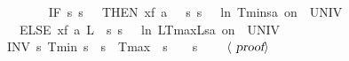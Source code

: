\documentclass[envcountsame]{llncs}
\begin{document}
\begin{example}
\begin{isabellebody}
\ \ \ \ %
\isanewline
\ \ \ \ {\isacharparenleft}IF\ {\isacharparenleft}{\isasymlambda}s{\isachardot}\ s{\isachardollar}{}\ {\isacharequal}\ {}{\isacharparenright}\ THEN\ {\isacharparenleft}x{\isasymacute}{\isacharequal}{\isacharparenleft}f\ a\ {}{\isacharparenright}\ {\isacharampersand}\ {\isacharparenleft}{\isasymlambda}s{\isachardot}\ s{\isachardollar}{}\ {\isasymle}\ {\isacharminus}\ {\isacharparenleft}ln\ {\isacharparenleft}Tmin{\isacharslash}s{\isachardollar}{}{\isacharparenright}{\isacharparenright}{\isacharslash}a{\isacharparenright}\ on\ {\isacharbraceleft}{}{\isachardot}{\isachardot}{\isasymtau}{\isacharbraceright}\ UNIV\ {\isacharat}\ {}{\isacharparenright}\ \isanewline
\ \ \ \ ELSE\ {\isacharparenleft}x{\isasymacute}{\isacharequal}{\isacharparenleft}f\ a\ L{\isacharparenright}\ {\isacharampersand}\ {\isacharparenleft}{\isasymlambda}s{\isachardot}\ s{\isachardollar}{}\ {\isasymle}\ {\isacharminus}\ {\isacharparenleft}ln\ {\isacharparenleft}{\isacharparenleft}L{\isacharminus}Tmax{\isacharparenright}{\isacharslash}{\isacharparenleft}L{\isacharminus}s{\isachardollar}{}{\isacharparenright}{\isacharparenright}{\isacharparenright}{\isacharslash}a{\isacharparenright}\ on\ {\isacharbraceleft}{}{\isachardot}{\isachardot}{\isasymtau}{\isacharbraceright}\ UNIV\ {\isacharat}\ {}{\isacharparenright}{\isacharparenright}\ {\isacharparenright}\isanewline
\ \ INV\ {\isacharparenleft}{\isasymlambda}s{\isachardot}\ Tmin\ {\isasymle}s{\isachardollar}{}\ {\isasymand}\ s{\isachardollar}{}\ {\isasymle}\ Tmax\ {\isasymand}\ {\isacharparenleft}s{\isachardollar}{}\ {\isacharequal}\ {}\ {\isasymor}\ s{\isachardollar}{}\ {\isacharequal}\ {}{\isacharparenright}{\isacharparenright}{\isacharparenright}{\isachardoublequoteclose}\isanewline
\ \ $\langle \isa{proof}\rangle$\isanewline
\end{isabellebody}
\end{example}
\end{document}
